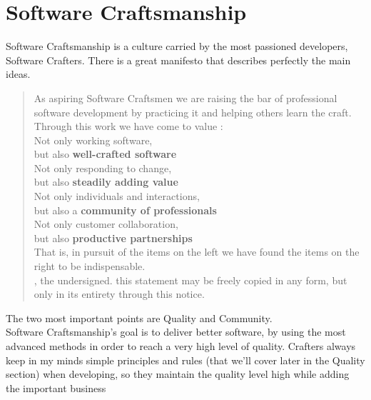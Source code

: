 \section{Software Craftsmanship}\label{sec:software-craftsmanship}
Software Craftsmanship is a culture carried by the most passioned
developers, Software Crafters.
There is a great manifesto that describes perfectly the main ideas.

\begin{quotation}
As aspiring Software Craftsmen we are raising the bar of professional
software development by practicing it and helping others learn the craft.
\\
\newline
Through this work we have come to value : \\
\newline
Not only working software, \\
\hspace*{1cm} but also \textbf{well-crafted software}\\
Not only responding to change, \\
\hspace*{1cm} but also \textbf{steadily adding value} \\
Not only individuals and interactions, \\
\hspace*{1cm} but also a \textbf{community of professionals} \\
Not only customer collaboration, \\
\hspace*{1cm} but also \textbf{productive partnerships} \\
\newline
That is, in pursuit of the items on the left we have found the items
on the right to be indispensable. \\
\newline
\small{, the undersigned.
this statement may be freely copied in any form,
but only in its entirety through this notice.}
\end{quotation}
The two most important points are Quality and Community. \\
Software Craftsmanship's goal is to deliver better software, by using the
most advanced methods in order to reach a very high level of quality.
Crafters always keep in my minds simple principles and rules
(that we'll cover later in the Quality section) when developing, so they
maintain the quality level high while adding the important business
